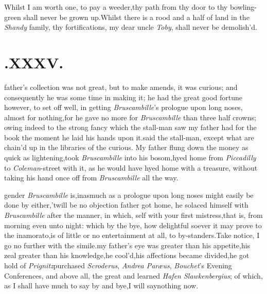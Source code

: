 \documentclass{article}
\begin{document}
Whilst I am worth one, to pay a\break
weeder,\tsk thy path from thy door to\break
thy bowling-green shall never be grown\break
up.\tsh Whilst there is a rood and a\break
half of land in the \textit{Shandy} family, thy\break
fortifications, my dear uncle \textit{Toby}, shall\break
never be demolish’d.

\section{.\quad  XXXV.}

 father’s collection was not
great, but to make amends, it was curious; and consequently he was
some time in making it; he had the great good fortune however, to
set off well, in getting \textit{Bruscambille}’s prologue upon
long noses, almost for nothing,\tsk for he gave no more for
\textit{Bruscambille} than three half crowns; owing indeed to the
strong fancy which the stall-man saw my father had for the book the
moment he laid his hands upon it.\tsk {}\tsk said the
stall-man, except what are chain’d up in the libraries of the
curious. My father flung down the mo\-ney as quick as
lightening,\tsk took \textit{Brus\-cambille} into his
bosom,\tsh hyed home from \textit{Piccadilly} to
\textit{Coleman}-street with it, as he would have hyed home with a
treasure, without taking his hand once off from
\textit{Bruscambille}
all the way.

\break
gender \textit{Bruscambille} is,\tsk inasmuch as a prologue upon long noses might easily
be done by either,\tsk ’twill be no objection 
father got home, he solaced
himself with \textit{Bruscambille} after the manner, in which,
self with your
first mistress,\tsh that is, from morning even unto night:
which by the bye, how delightful soever it may prove to the
inamorato,\tsk is of little or no entertainment at all, to
by-standers.\tsk Take notice, I go no further with the
simile.\tsk my father’s eye was greater than his
appetite,\tsk his zeal greater than his know\-ledge,\tsk he
cool’d,\tsk his affections became divided,\tsh he
got hold of \textit{Prig\-nitz}\tsk purchased \textit{Scroderus}, \textit{Andrea
Paræ\-us}, \textit{Bouchet}’s Evening Conferences, and above all,
the great and learned \textit{Hafen Slawkenbergius}; of which, as I
shall have much to say by and bye,\tsk I will say\break nothing now.
\end{document}
